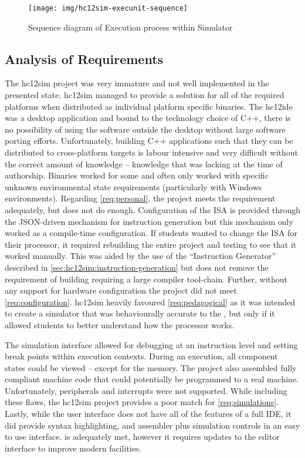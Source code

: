 \begin{figure}[!ph]
    \centering
    \texttt{[image: img/hc12sim-execunit-sequence]}
    \caption{Sequence diagram of Execution process within Simulator}
    \label{fig:hc12sim-execunit-sequence}
\end{figure} 

\subsection{Analysis of Requirements}
\label{sec:review-prev-hc12sim}

The hc12sim project was very immature and not well implemented in the presented state. hc12sim managed to provide a solution for all of the required platforms when distributed as individual platform specific binaries. The hc12ide was a desktop application and bound to the technology choice of C++, there is no possibility of using the software outside the desktop without large software porting efforts. Unfortunately, building C++ applications such that they can be distributed to cross-platform targets is labour intensive and very difficult without the correct amount of knowledge -- knowledge that was lacking at the time of authorship. Binaries worked for some and often only worked with specific unknown environmental state requirements (particularly with Windows environments). Regarding \cref{req:personal}, the project meets the requirement adequately, but does not do enough. Configuration of the ISA is provided through the JSON-driven mechanism for instruction generation but this mechanism only worked as a compile-time configuration. If students wanted to change the ISA for their processor, it required rebuilding the entire project and testing to see that it worked manually. This was aided by the use of the ``Instruction Generator'' described in \cref{sec:hc12sim:instruction-generation} but does not remove the requirement of building requiring a large compiler tool-chain. Further, without any support for hardware configuration the project did not meet \cref{req:configuration}. hc12sim heavily favoured \cref{req:pedagogical} as it was intended to create a simulator that was behaviourally accurate to the \hcmodel, but only if it allowed students to better understand how the processor works.

The simulation interface allowed for debugging at an instruction level and setting break points within execution contexts. During an execution, all component states could be viewed -- except for the memory. The project also assembled fully compliant machine code that could potentially be programmed to a real machine. Unfortunately, peripherals and interrupts were not supported. While including these flaws, the hc12sim project provides a poor match for \cref{req:simulations}. Lastly, while the user interface does not have all of the features of a full IDE, it did provide syntax highlighting, and assembler plus simulation controls in an easy to use interface.  is adequately met, however it requires updates to the editor interface to improve modern facilities.

